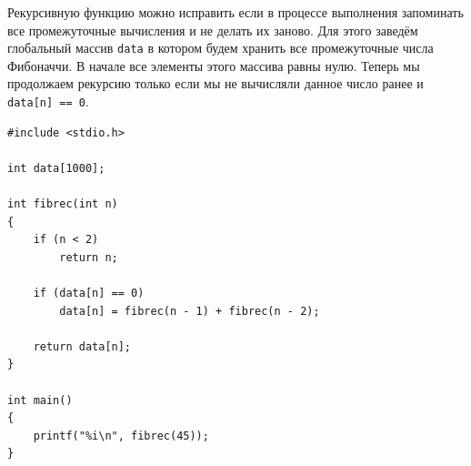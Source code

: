 \documentclass{article}
\begin{document}
\begin{itemize}
Рекурсивную функцию можно исправить если в процессе выполнения запоминать все промежуточные вычисления и не делать их заново. Для этого заведём глобальный массив \texttt{data} в котором будем хранить все промежуточные числа Фибоначчи. В начале все элементы этого массива равны нулю. Теперь мы продолжаем рекурсию только если мы не вычисляли данное число ранее и \texttt{data[n] == 0}.

\begin{lstlisting}
#include <stdio.h>

int data[1000];

int fibrec(int n) 
{
    if (n < 2)
        return n;

    if (data[n] == 0)
        data[n] = fibrec(n - 1) + fibrec(n - 2);

    return data[n];
}

int main() 
{
    printf("%i\n", fibrec(45));
}
\end{lstlisting}

\end{itemize}



\newpage
\end{document}
